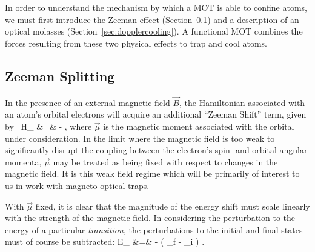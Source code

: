 In order to understand the mechanism by which a MOT is able to confine atoms, we must first introduce the Zeeman effect (Section~\ref{sec:zeemansplitting}) and a description of an optical molasses (Section~\ref{sec:dopplercooling}). A functional MOT combines the forces resulting from these two physical effects to trap and cool atoms.




\subsection{Zeeman Splitting}
\label{sec:zeemansplitting}
In the presence of an external magnetic field $\vec{B}$, the Hamiltonian associated with an atom's orbital electrons will acquire an additional ``Zeeman Shift'' term, given by~\cite{corney}
\bea
\label{zeeman_hamiltonian}
H_{} &=& - \vec{\mu}\cdot {},
\eea
where $\vec{\mu}$ is the magnetic moment associated with the orbital under consideration.  In the limit where the magnetic field is too weak to significantly disrupt the coupling between the electron's spin- and orbital angular momenta, $\vec{\mu}$ may be treated as being fixed with respect to changes in the magnetic field.  It is this weak field regime which will be primarily of interest to us in work with magneto-optical traps.


With $\vec{\mu}$ fixed, it is clear that the magnitude of the energy shift must scale linearly with the strength of the magnetic field.  In considering the perturbation to the energy of a particular \emph{transition}, the perturbations to the initial and final states must of course be subtracted:
\bea
\Delta E_{} &=& - \left( \vec{\mu}_f - \vec{\mu}_i \right) \cdot {}.
\eea 

